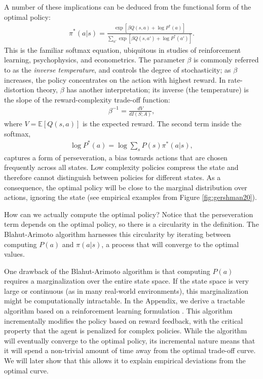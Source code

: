 \documentclass[11pt]{article}
\begin{document}
A number of these implications can be deduced from the functional form of the optimal policy:
\begin{align}
    \pi^\ast(a|s) = \frac{\exp[\beta Q(s,a) + \log P^\ast(a)]}{\sum_{a'} \exp[\beta Q(s,a') + \log P^\ast(a')]}.
    \label{eq:optimalpolicy}
\end{align}
This is the familiar softmax equation, ubiquitous in studies of reinforcement learning, psychophysics, and econometrics. The parameter $\beta$ is commonly referred to as the \emph{inverse temperature}, and controls the degree of stochasticity; as $\beta$ increases, the policy concentrates on the action with highest reward. In rate-distortion theory, $\beta$ has another interpretation; its inverse (the temperature) is the slope of the reward-complexity trade-off function:
\begin{align}
    \beta^{-1} = \frac{d V}{d I(S;A)},
    \label{eq:beta}
\end{align}
where $V = \mathbb{E}[Q(s,a)]$ is the expected reward. The second term inside the softmax,
\begin{align}
    \log P^\ast(a) = \log \sum_s P(s) \pi^\ast(a|s),
\end{align}
captures a form of perseveration, a bias towards actions that are chosen frequently across all states. Low complexity policies compress the state and therefore cannot distinguish between policies for different states. As a consequence, the optimal policy will be close to the marginal distribution over actions, ignoring the state (see empirical examples from Figure \ref{fig:gershman20}).

How can we actually compute the optimal policy? Notice that the perseveration term depends on the optimal policy, so there is a circularity in the definition. The Blahut-Arimoto algorithm \citep{blahut72,arimoto72} harnesses this circularity by iterating between computing $P(a)$ and $\pi(a|s)$, a process that will converge to the optimal values.

One drawback of the Blahut-Arimoto algorithm is that computing $P(a)$ requires a marginalization over the entire state space. If the state space is very large or continuous (as in many real-world environments), this marginalization might be computationally intractable. In the Appendix, we derive a tractable algorithm based on a reinforcement learning formulation \citep[see also][]{gershmanlai20}. This algorithm incrementally modifies the policy based on reward feedback, with the critical property that the agent is penalized for complex policies. While the algorithm will eventually converge to the optimal policy, its incremental nature means that it will spend a non-trivial amount of time away from the optimal trade-off curve. We will later show that this allows it to explain empirical deviations from the optimal curve.
\end{document}
